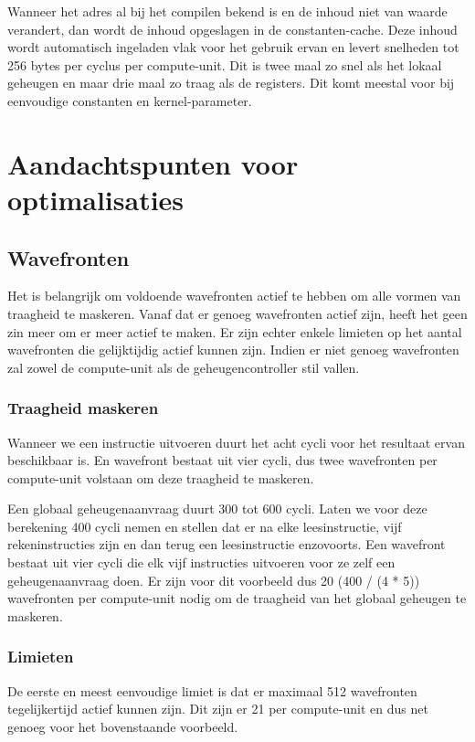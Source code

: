 Wanneer het adres al bij het compilen bekend is en de inhoud niet van waarde verandert, dan wordt de inhoud opgeslagen in de constanten-cache. Deze inhoud wordt automatisch ingeladen vlak voor het gebruik ervan en levert snelheden tot 256 bytes per cyclus per compute-unit. Dit is twee maal zo snel als het lokaal geheugen en maar drie maal zo traag als de registers. Dit komt meestal voor bij eenvoudige constanten en kernel-parameter.


\section{Aandachtspunten voor optimalisaties}

\subsection{Wavefronten}
Het is belangrijk om voldoende wavefronten actief te hebben om alle vormen van traagheid te maskeren. Vanaf dat er genoeg wavefronten actief zijn, heeft het geen zin meer om er meer actief te maken. Er zijn echter enkele limieten op het aantal wavefronten die gelijktijdig actief kunnen zijn. Indien er niet genoeg wavefronten zal zowel de compute-unit als de geheugencontroller stil vallen.

\subsubsection{Traagheid maskeren}
Wanneer we een instructie uitvoeren duurt het acht cycli voor het resultaat ervan beschikbaar is. En wavefront bestaat uit vier cycli, dus twee wavefronten per compute-unit volstaan om deze traagheid te maskeren.

Een globaal geheugenaanvraag duurt 300 tot 600 cycli. Laten we voor deze berekening 400 cycli nemen en stellen dat er na elke leesinstructie, vijf rekeninstructies zijn en dan terug een leesinstructie enzovoorts. Een wavefront bestaat uit vier cycli die elk vijf instructies uitvoeren voor ze zelf een geheugenaanvraag doen. Er zijn voor dit voorbeeld dus 20 (400 / (4 * 5)) wavefronten per compute-unit nodig om de traagheid van het globaal geheugen te maskeren.

\subsubsection{Limieten}
De eerste en meest eenvoudige limiet is dat er maximaal 512 wavefronten tegelijkertijd actief kunnen zijn. Dit zijn er 21 per compute-unit en dus net genoeg voor het bovenstaande voorbeeld.

